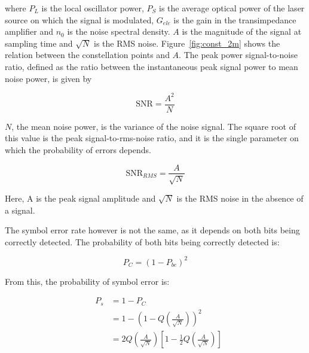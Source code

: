 \begin{refsection}
\noindent where $P_L$ is the local oscillator power, $P_S$ is the average optical power of the laser source on which the signal is modulated, $G_{ele}$ is the gain in the transimpedance amplifier and $n_0$ is the noise spectral density. $A$ is the magnitude of the signal at sampling time and $\sqrt{N}$ is the RMS noise. Figure~\ref{fig:const_2m} shows the relation between the constellation points and $A$.
The peak power signal-to-noise ratio, defined as the ratio between the instantaneous peak signal power to mean noise power, is given by

\begin{equation}
	\text{SNR} = \frac{A^2}{{N}}
\end{equation}

$N$, the mean noise power, is the variance of the noise signal. The square root of this value is the peak signal-to-rms-noise ratio, and it is the single parameter on which the probability of errors depends.

\begin{equation}
\text{SNR}_{RMS} = \frac{A}{\sqrt{N}}
\end{equation}

Here, A is the peak signal amplitude and $\sqrt{N}$ is the RMS noise in the absence of a signal.

The symbol error rate however is not the same, as it depends on both bits being correctly detected. The probability of both bits being correctly detected is:

\begin{equation}
P_C = (1 - P_{be})^2
\end{equation}

From this, the probability of symbol error is:

\begin{eqnarray}
&P_s &= 1-P_C \nonumber\\
&	   &= 1 - \left(1 - Q \left({\frac{A}{\sqrt{N}}}\right)\right)^2 \nonumber \\
&	   &= 2 Q\left({\frac{A}{\sqrt{N}}}\right)\left[1-\frac{1}{2} Q \left({\frac{A}{\sqrt{N}}}\right)\right]
\end{eqnarray}





\end{refsection}

